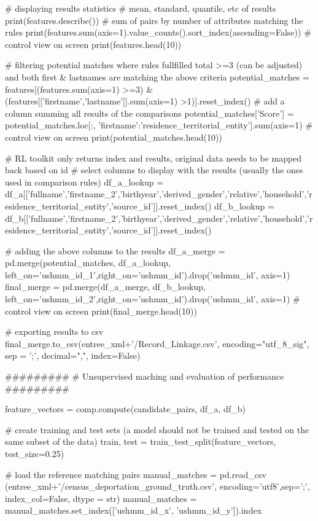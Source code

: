 \documentclass[a4paper,12pt,twoside]{book}
\begin{document}
\begin{python}
  # displaying results statistics
  # mean, standard, quantile, etc of results
  print(features.describe())
  # sum of pairs by number of attributes matching the rules
  print(features.sum(axis=1).value_counts().sort_index(ascending=False))
  # control view on screen
  print(features.head(10))
  
  # filtering potential matches where rules fullfilled total >=3 (can be adjusted) and both first & lastnames are matching the above criteria
  potential_matches = features[(features.sum(axis=1) >=3) & (features[['firstname','lastname']].sum(axis=1) >1)].reset_index()
  # add a column summing all results of the comparisons
  potential_matches['Score'] = potential_matches.loc[:, 'firstname':'residence_territorial_entity'].sum(axis=1)
  # control view on screen
  print(potential_matches.head(10))

  # RL toolkit only returns index and results, original data needs to be mapped back based on id
  # select columns to display with the results (usually the ones used in comparison rules)
  df_a_lookup = df_a[['fullname','firstname_2','birthyear','derived_gender','relative','household','residence_territorial_entity','source_id']].reset_index()
  df_b_lookup = df_b[['fullname','firstname_2','birthyear','derived_gender','relative','household','residence_territorial_entity','source_id']].reset_index()
  
  # adding the above columns to the results
  df_a_merge = pd.merge(potential_matches, df_a_lookup, left_on='ushmm_id_1',right_on='ushmm_id').drop('ushmm_id', axis=1)
  final_merge = pd.merge(df_a_merge, df_b_lookup, left_on='ushmm_id_2',right_on='ushmm_id').drop('ushmm_id', axis=1)
  # control view on screen
  print(final_merge.head(10))

  # exporting results to csv
  final_merge.to_csv(entree_xml+'/Record_Linkage.csv', encoding="utf_8_sig", sep = ';', decimal=",", index=False)
  
  #########
  # Unsupervised maching and evaluation of performance
  #########

  feature_vectors = comp.compute(candidate_pairs, df_a, df_b)
  
  # create training and test sets (a model should not be trained and tested on the same subset of the data)
  train, test = train_test_split(feature_vectors, test_size=0.25)

  # load the reference matching pairs
  manual_matches = pd.read_csv (entree_xml+'/census_deportation_ground_truth.csv', encoding='utf8',sep=';', index_col=False, dtype = str)
  manual_matches = manual_matches.set_index(['ushmm_id_x', 'ushmm_id_y']).index


\end{python}
\end{document}
